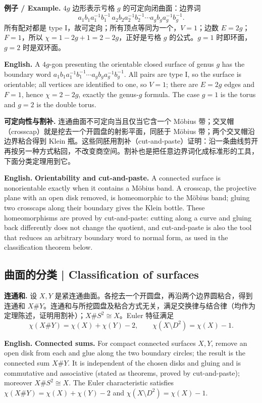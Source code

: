 \documentclass[UTF8,11pt,a4paper]{ctexart}
\newcommand{\EN}[1]{\par\noindent\textbf{English.} #1\par}
\newcommand{\EX}[2]{\par\noindent\textbf{例子 / Example.} #1\par\EN{#2}}
\begin{document}
\EX{$4g$ 边形表示亏格 $g$ 的可定向闭曲面：边界词
\[
a_1b_1a_1^{-1}b_1^{-1}\,a_2b_2a_2^{-1}b_2^{-1}\cdots a_gb_ga_g^{-1}b_g^{-1}.
\]
所有配对都是 type I，故可定向；所有顶点等同为一个，$V=1$；边数 $E=2g$；$F=1$，所以 $\chi=1-2g+1=2-2g$，正好是亏格 $g$ 的公式。$g=1$ 时即环面，$g=2$ 时是双环面。}{A $4g$-gon presenting the orientable closed surface of genus $g$ has the boundary word $a_1b_1a_1^{-1}b_1^{-1}\cdots a_gb_ga_g^{-1}b_g^{-1}$. All pairs are type I, so the surface is orientable; all vertices are identified to one, so $V=1$; there are $E=2g$ edges and $F=1$, hence $\chi=2-2g$, exactly the genus-$g$ formula. The case $g=1$ is the torus and $g=2$ is the double torus.}

\noindent\textbf{可定向性与割补.} 连通曲面不可定向当且仅当它含一个 M\"obius 带；交叉帽（crosscap）就是挖去一个开圆盘的射影平面，同胚于 M\"obius 带；两个交叉帽沿边界粘合得到 Klein 瓶。这些同胚用割补（cut-and-paste）证明：沿一条曲线剪开再按另一种方式粘回，不改变商空间。割补也是把任意边界词化成标准形的工具，下面分类定理用到它。
\EN{\textbf{Orientability and cut-and-paste.} A connected surface is nonorientable exactly when it contains a M\"obius band. A crosscap, the projective plane with an open disk removed, is homeomorphic to the M\"obius band; gluing two crosscaps along their boundary gives the Klein bottle. These homeomorphisms are proved by cut-and-paste: cutting along a curve and gluing back differently does not change the quotient, and cut-and-paste is also the tool that reduces an arbitrary boundary word to normal form, as used in the classification theorem below.}

\subsection{曲面的分类 | Classification of surfaces}
\noindent\textbf{连通和.} 设 $X,Y$ 是紧连通曲面。各挖去一个开圆盘，再沿两个边界圆粘合，得到连通和 $X\#Y$。连通和与所挖圆盘及粘合方式无关，满足交换律与结合律（均作为定理陈述，证明用割补）；$X\#S^2\cong X$。Euler 特征满足
\[
\chi(X\#Y)=\chi(X)+\chi(Y)-2,\qquad \chi(X\setminus D^2)=\chi(X)-1.
\]
\EN{\textbf{Connected sums.} For compact connected surfaces $X,Y$, remove an open disk from each and glue along the two boundary circles; the result is the connected sum $X\#Y$. It is independent of the chosen disks and gluing and is commutative and associative (stated as theorems, proved by cut-and-paste); moreover $X\#S^2\cong X$. The Euler characteristic satisfies $\chi(X\#Y)=\chi(X)+\chi(Y)-2$ and $\chi(X\setminus D^2)=\chi(X)-1$.}
\end{document}
